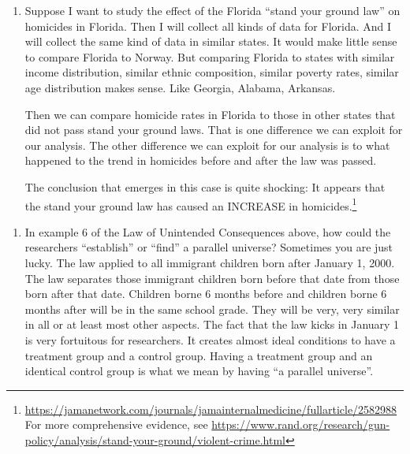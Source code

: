 \documentclass[
]{book}
\providecommand{\tightlist}{%
  \setlength{\itemsep}{0pt}\setlength{\parskip}{0pt}}
\begin{document}
\begin{enumerate}
\def\labelenumi{\arabic{enumi}.}
\item
  Suppose I want to study the effect of the Florida ``stand your ground law'' on homicides in Florida. Then I will collect all kinds of data for Florida. And I will collect the same kind of data in similar states. It would make little sense to compare Florida to Norway. But comparing Florida to states with similar income distribution, similar ethnic composition, similar poverty rates, similar age distribution makes sense. Like Georgia, Alabama, Arkansas.

  Then we can compare homicide rates in Florida to those in other states that did not pass stand your ground laws. That is one difference we can exploit for our analysis. The other difference we can exploit for our analysis is to what happened to the trend in homicides before and after the law was passed.

  The conclusion that emerges in this case is quite shocking: It appears that the stand your ground law has caused an INCREASE in homicides.\footnote{\url{https://jamanetwork.com/journals/jamainternalmedicine/fullarticle/2582988}
    For more comprehensive evidence, see
    \url{https://www.rand.org/research/gun-policy/analysis/stand-your-ground/violent-crime.html}}
\end{enumerate}

\begin{enumerate}
\def\labelenumi{\arabic{enumi}.}
\setcounter{enumi}{1}
\tightlist
\item
  In example 6 of the Law of Unintended Consequences above, how could the researchers ``establish'' or ``find'' a parallel universe? Sometimes you are just lucky. The law applied to all immigrant children born after January 1, 2000. The law separates those immigrant children born before that date from those born after that date. Children borne 6 months before and children borne 6 months after will be in the same school grade. They will be very, very similar in all or at least most other aspects. The fact that the law kicks in January 1 is very fortuitous for researchers. It creates almost ideal conditions to have a treatment group and a control group. Having a treatment group and an identical control group is what we mean by having ``a parallel universe''.
\end{enumerate}
\end{document}

